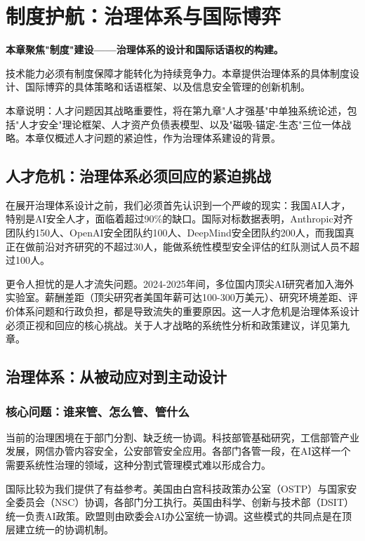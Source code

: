 \chapter{制度护航：治理体系与国际博弈}

\textbf{本章聚焦"制度"建设——治理体系的设计和国际话语权的构建。}

技术能力必须有制度保障才能转化为持续竞争力。本章提供治理体系的具体制度设计、国际博弈的具体策略和话语框架、以及信息安全管理的创新机制。

本章说明：人才问题因其战略重要性，将在第九章"人才强基"中单独系统论述，包括"人才安全"理论框架、人才资产负债表模型、以及"磁吸-锚定-生态"三位一体战略。本章仅概述人才问题的紧迫性，作为治理体系建设的背景。

\section{人才危机：治理体系必须回应的紧迫挑战}

在展开治理体系设计之前，我们必须首先认识到一个严峻的现实：我国AI人才，特别是AI安全人才，面临着超过90\%的缺口。国际对标数据表明，Anthropic对齐团队约150人、OpenAI安全团队约100人、DeepMind安全团队约200人，而我国真正在做前沿对齐研究的不超过30人，能做系统性模型安全评估的红队测试人员不超过100人。

更令人担忧的是人才流失问题。2024-2025年间，多位国内顶尖AI研究者加入海外实验室。薪酬差距（顶尖研究者美国年薪可达100-300万美元）、研究环境差距、评价体系问题和行政负担，都是导致流失的重要原因。这一人才危机是治理体系设计必须正视和回应的核心挑战。关于人才战略的系统性分析和政策建议，详见第九章。

\section{治理体系：从被动应对到主动设计}

\subsection{核心问题：谁来管、怎么管、管什么}

当前的治理困境在于部门分割、缺乏统一协调。科技部管基础研究，工信部管产业发展，网信办管内容安全，公安部管安全应用。各部门各管一段，在AI这样一个需要系统性治理的领域，这种分割式管理模式难以形成合力。

国际比较为我们提供了有益参考。美国由白宫科技政策办公室（OSTP）与国家安全委员会（NSC）协调，各部门分工执行。英国由科学、创新与技术部（DSIT）统一负责AI政策。欧盟则由欧委会AI办公室统一协调。这些模式的共同点是在顶层建立统一的协调机制。

